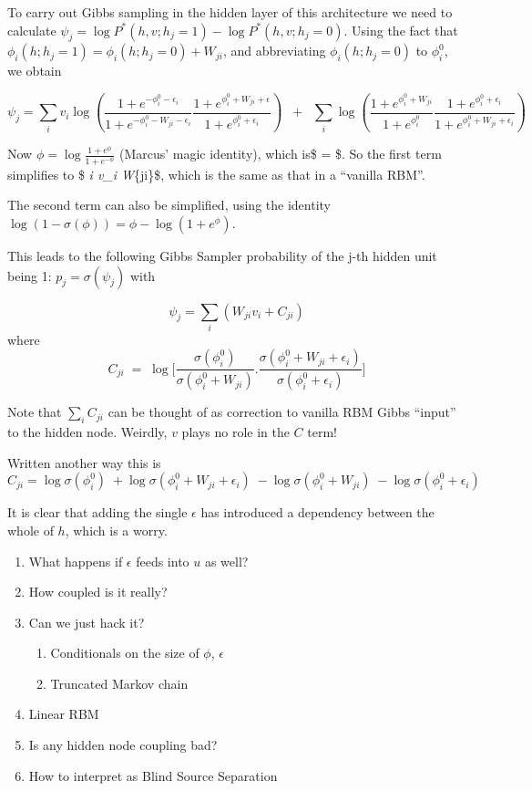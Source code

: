 \documentclass{article}
\begin{document}
To carry out Gibbs sampling in the hidden layer of this architecture we
need to calculate
\(\psi_j = \log P^*(h,v ; h_j =1 ) - \log P^*(h,v ; h_j = 0)\). Using
the fact that \(\phi_i(h ; h_j=1) = \phi_i(h ; h_j=0) + W_{ji}\), and
abbreviating \(\phi_i(h ; h_j=0)\) to \(\phi_i^0\), we obtain

\[\psi_j = \sum_i v_i \log \left( \frac{1+ e^{-\phi_i^0 - \epsilon_i}}{1+e^{-\phi_i^0 - W_{ji} -\epsilon_i}} \frac{1+ e^{\phi_i^0 + W_{ji} + \epsilon}}{1+e^{\phi_i^0 + \epsilon_i}}\right) \;\;+ \;\;\sum_i \log \left(\frac{1+e^{\phi_i^0 + W_{ji}}}{1+ e^{\phi_i^0}}
\frac{1+e^{\phi_i^0 + \epsilon_i}}{1+ e^{\phi_i^0 + W_{ji} + \epsilon_i}} \right)\]

Now \(\phi = \log \frac{1+e^{\phi}}{1+e^{-\phi}}\) (Marcus' magic
identity), which is\$ = \log \frac{\sigma(\phi)}{\sigma(-\phi)}\$. So
the first term simplifies to \$ \sum\emph{i v\_i W}\{ji\}\$, which is
the same as that in a ``vanilla RBM''.

    The second term can also be simplified, using the identity
\(\log(1-\sigma(\phi)) = \phi - \log(1+e^\phi)\).

    This leads to the following Gibbs Sampler probability of the j-th hidden
unit being 1: \(p_j = \sigma(\psi_j)\) with

\[\psi_j = \sum_i (W_{ji} v_i + C_{ji}) \] where
\[C_{ji} \; = \;\log \bigg[ \frac{\sigma (\phi_i^0)}{\sigma (\phi_i^0 + W_{ji})} . \frac{\sigma (\phi_i^0 + W_{ji} + \epsilon_i) }{\sigma (\phi_i^0 + \epsilon_i)} \bigg] \]

Note that \(\sum_i C_{ji}\) can be thought of as correction to vanilla
RBM Gibbs ``input'' to the hidden node. Weirdly, \(v\) plays no role in
the \(C\) term!

Written another way this is
\[C_{ji} = \log \sigma(\phi_i^0)  \; +\log \sigma (\phi_i^0 + W_{ji} + \epsilon_i) \;- \log \sigma (\phi_i^0 + W_{ji})  \;- \log \sigma ( \phi_i^0  + \epsilon _i) \]

    It is clear that adding the single \(\epsilon\) has introduced a
dependency between the whole of \(h\), which is a worry.

    \begin{enumerate}
\def\labelenumi{\arabic{enumi})}
\itemsep1pt\parskip0pt
\item
  What happens if \(\epsilon\) feeds into \(u\) as well?
\item
  How coupled is it really?
\item
  Can we just hack it?

  \begin{enumerate}
  \def\labelenumii{\alph{enumii})}
  \itemsep1pt\parskip0pt
  \item
    Conditionals on the size of \(\phi\), \(\epsilon\)
  \item
    Truncated Markov chain
  \end{enumerate}
\item
  Linear RBM
\item
  Is any hidden node coupling bad?
\item
  How to interpret as Blind Source Separation
\end{enumerate}
\end{document}
